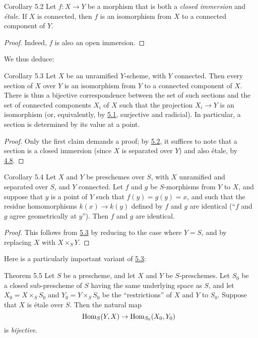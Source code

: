 \begin{itenv}{Corollary 5.2}
\label{I.5.2}
  Let $f\colon X\to Y$ be a morphism that is both a \emph{closed immersion} and \emph{étale}.
  If $X$ is connected, then $f$ is an isomorphism from $X$ to a connected component of $Y$.
\end{itenv}

\begin{proof}
  Indeed, $f$ is also an open immersion.
\end{proof}

We thus deduce:

\begin{itenv}{Corollary 5.3}
\label{I.5.3}
  Let $X$ be an unramified $Y$-scheme, with $Y$ connected.
  Then every section of $X$ over $Y$ is an isomorphism from $Y$ to a connected component of $X$.
  There is thus a bijective correspondence between the set of such sections and the set of connected components $X_i$ of $X$ such that the projection $X_i\to Y$ is an isomorphism (or, equivalently, by \hyperref[I.5.1]{5.1}, surjective and radicial).
  In particular, a section is determined by its value at a point.
\end{itenv}

\begin{proof}
  Only the first claim demands a proof;
  by \hyperref[I.5.2]{5.2}, it suffices to note that a section is a closed immersion (since $X$ is separated over $Y$) and also étale, by \hyperref[I.4.8]{4.8}.
\end{proof}

\begin{itenv}{Corollary 5.4}
\label{I.5.4}
  Let $X$ and $Y$ be preschemes over $S$, with $X$ unramified and separated over $S$, and $Y$ connected.
  Let $f$ and $g$ be $S$-morphisms from $Y$ to $X$, and suppose that $y$ is a point of $Y$ such that $f(y)=g(y)=x$, and such that the residue homomorphisms $k(x)\to k(y)$ defined by $f$ and $g$ are identical (``$f$ and $g$ agree geometrically at $y$'').
  Then $f$ and $g$ are identical.
\end{itenv}

\begin{proof}
  This follows from \hyperref[I.5.3]{5.3} by reducing to the case where $Y=S$, and by replacing $X$ with $X\times_S Y$.
\end{proof}

Here is a particularly important variant of \hyperref[I.5.3]{5.3}:

\begin{itenv}{Theorem 5.5}
\label{I.5.5}
  Let $S$ be a prescheme, and let $X$ and $Y$ be $S$-preschemes.
  Let $S_0$ be a closed sub-prescheme of $S$ having the same underlying space as $S$, and let $X_0=X\times_S S_0$ and $Y_0=Y\times_S S_0$ be the ``restrictions'' of $X$ and $Y$ to $S_0$.
  Suppose that $X$ is étale over $S$.
  Then the natural map
  \[
    \operatorname{Hom}_S(Y,X) \to \operatorname{Hom}_{S_0}(X_0,Y_0)
  \]
  is \emph{bijective}.
\end{itenv}

